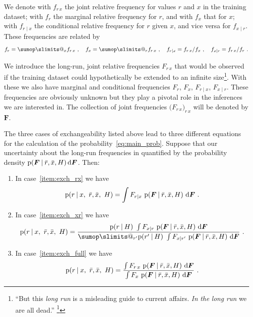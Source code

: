 \documentclass[\ifafour a4paper,12pt,\else a5paper,10pt,\fi%
onecolumn,oneside,article,%
british%
]{memoir}
\makeatletter
\theoremstyle{remark}
\theoremstyle{innote}
\def\sum{\DOTSI\sumop\slimits@}
\newcommand*{\citep}{\footcites}
\newcommand*{\di}{\mathrm{d}}%
\newcommand*{\p}{\mathrm{p}}%
\renewcommand*{\|}[1][]{\nonscript\:#1\vert\nonscript\:\mathopen{}}
\renewcommand*{\=}{\TextOrMath\texteq\eq}
\newcommand*{\sect}{\S}%
\newcommand*{\q}{}%
\DeclareRobustCommand*{\q}{%
  \mathord{\mathpalette\bigcdot@{}}%
}
\newcommand*{\bigcdot@scalefactor}{0.7}
\newcommand*{\bigcdot@widthfactor}{1.5}
\newcommand*{\bigcdot@}[2]{%
  \sbox0{$#1\vcenter{}$}%
  \sbox2{$#1\cdot\m@th$}%
  \hbox to \bigcdot@widthfactor\wd2{%
    \hfil
    \raise\ht0\hbox{%
      \scalebox{\bigcdot@scalefactor}{%
        \lower\ht0\hbox{$#1\bullet\m@th$}%
      }%
    }%
    \hfil
  }%
}
\newcommand*{\ro}{r}
\newcommand*{\xo}{x}
\newcommand*{\rd}{\bar{r}}
\newcommand*{\xd}{\bar{x}}
\newcommand*{\yF}{\bm{F}}
\makeatother
\begin{document}
We denote with $f_{r\, x}$ the joint relative frequency for values $r$ and
$x$ in the training dataset; with $f_{r\q}$ the marginal relative frequency
for $r$, and with $f_{\q x}$ that for $x$; with $f_{r\mid x}$ the
conditional relative frequency for $r$ given $x$, and vice versa for
$f_{x \mid r}$. These frequencies are related by
\begin{equation}
  \label{eq:frequencies_relations}
  f_{r\q}=\sum_{x} f_{r\,x}\ , \quad
  f_{\q x}=\sum_{r} f_{r\,x}\ ,\quad
  f_{r\mid x}=f_{r\,x}/f_{\q x}\ , \quad
  f_{x\mid r}=f_{r\,x}/f_{r\q}\ .
\end{equation}

We introduce the long-run, joint relative frequencies $F_{r\,x}$ that would
be observed if the training dataset could hypothetically be extended to an
infinite size\footnote{\enquote{But this \emph{long run} is a misleading
    guide to current affairs. \emph{In the long run} we are all dead.}
  \citep[\sect~3.I, p.~65]{keynes1923_r2013}}. With these we also have
marginal and conditional frequencies $F_{r\q}$, $F_{\q x}$, $F_{r\mid x}$,
$F_{x \mid r}$. These frequencies are obviously unknown but they play a
pivotal role in the inferences we are interested in. The collection of
joint frequencies $\bigl(F_{r\,x}\bigr)_{r\,x}$ will be denoted by $\yF$.

\bigskip



The three cases of exchangeability listed above lead to three different
equations for the calculation of the probability~\eqref{eq:main_prob}.
Suppose that our uncertainty about the long-run frequencies in quantified
by the probability density $\p(\yF\|\rd,\xd, H)\,\di\yF$. Then:
\begin{enumerate}[label=\Roman*.]
\item In case~\ref{item:exch_rx} we have
  \begin{equation}
    \label{eq:prob_rx_case_rx}
    \p(\ro \| \xo,\ \rd,\xd,\ H) =
    \int F_{\ro\mid\xo} \ \p(\yF\|\rd,\xd, H)\ \di\yF \ .
  \end{equation}
\item In case~\ref{item:exch_xr} we have
  \begin{equation}
    \label{eq:prob_rx_case_xr}
    \p(\ro \| \xo,\ \rd,\xd,\ H) =
    \frac{
     \p(\ro\| H)\  \int F_{\xo\mid\ro} \ \p(\yF\|\rd,\xd, H)\ \di\yF
    }{
     \sum_{r'} \p(r' \| H)\  \int F_{\xo\mid r'} \ \p(\yF\|\rd,\xd, H)\ \di\yF
      } \ .
  \end{equation}
\item In case~\ref{item:exch_full} we have
  \begin{equation}
    \label{eq:prob_rx_case_full}
    \p(\ro \| \xo,\ \rd,\xd,\ H) =
    \frac{
     \int F_{\ro\,\xo} \ \p(\yF\|\rd,\xd, H)\ \di\yF
    }{
     \int F_{\q\xo} \ \p(\yF\|\rd,\xd, H)\ \di\yF
      } \ .
  \end{equation}
\end{enumerate}
\end{document}
